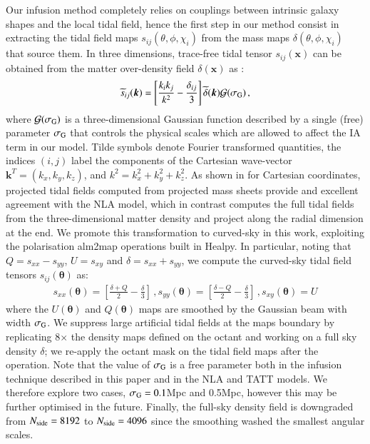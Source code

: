 \documentclass[useAMS,usenatbib]{mn2e}
\begin{document}
Our infusion method completely relies on couplings between intrinsic galaxy shapes and the local tidal field, hence the first step in our method consist in extracting the tidal field maps $s_{ij}(\theta,\phi,\chi_i)$ from the mass maps $\delta(\theta,\phi,\chi_i)$ that source them. In three dimensions, trace-free tidal tensor $s_{ij}(\boldsymbol x)$ can be obtained from the matter over-density field $\delta(\boldsymbol x)$ as   \citep{Catelan_IA_Tidal}:
\begin{eqnarray}
 \widetilde{s}_{ij} (\boldsymbol k)  = \left[\frac{k_i k_j}{k^2} - \frac{\delta_{ij}}{3}\right]  \widetilde {\delta}(\boldsymbol k) \mathcal{G}(\sigma_{\rm G}) \, ,
 \label{eq:sij}
\end{eqnarray}
where $\mathcal{G}(\sigma_{\rm G})$ is a three-dimensional Gaussian function described by a single (free) parameter $\sigma_{\rm G}$ that  controls the physical scales which are allowed to affect the IA term in our model. 
Tilde symbols  denote Fourier transformed quantities,  the indices $(i,j)$ label the components of the Cartesian wave-vector $\boldsymbol{k}^T = (k_x,k_y,k_z)$, and $k^2 = k_x^2 + k_y^2 + k_z^2$. 
As shown in \citet{Tidalator} for Cartesian coordinates, projected tidal fields  computed from projected mass sheets provide and excellent agreement with the NLA model, which in contrast computes the full tidal fields from the three-dimensional matter density and project along the radial dimension at the end. We promote this transformation to curved-sky in this work, exploiting the  polarisation {\sc alm2map} operations built in {\sc Healpy}. In particular, noting that $Q=s_{xx}-s_{yy}$, $U=s_{xy}$ and $\delta=s_{xx}+s_{yy}$, we compute the curved-sky tidal field tensors ${s}_{ij}({\boldsymbol \theta})$ as:
 \begin{eqnarray}
s_{xx}({\boldsymbol \theta})  =  \left[\frac{ \delta + Q}{2}  - \frac{\delta}{3}\right] \, ,s_{yy}({\boldsymbol \theta})  =  \left[\frac{\delta - Q}{2}  - \frac{\delta}{3}\right] \, , s_{xy}({\boldsymbol \theta}) = U
 \label{eq:sij_2D_sph}
 \end{eqnarray}
where the $U({\boldsymbol \theta})$ and $Q({\boldsymbol \theta})$ maps are smoothed by the Gaussian beam with width $\sigma_{\rm G}$. We suppress large artificial tidal fields at the maps boundary by replicating 8$\times$ the density maps defined on the octant and working on a full sky density $\delta$; we re-apply the octant mask on the tidal field maps after the operation. Note that the value of $\sigma_{\rm G}$ is a free parameter both in the infusion technique described in this paper and in the NLA and TATT models. We therefore explore two cases, $\sigma_{\rm G}=0.1$Mpc and 0.5Mpc, however this may be further optimised in the future. Finally, the full-sky density field is downgraded from $N_{\rm side}=8192$ to $N_{\rm side}=4096$ since the smoothing washed the smallest angular scales. 
\end{document}
